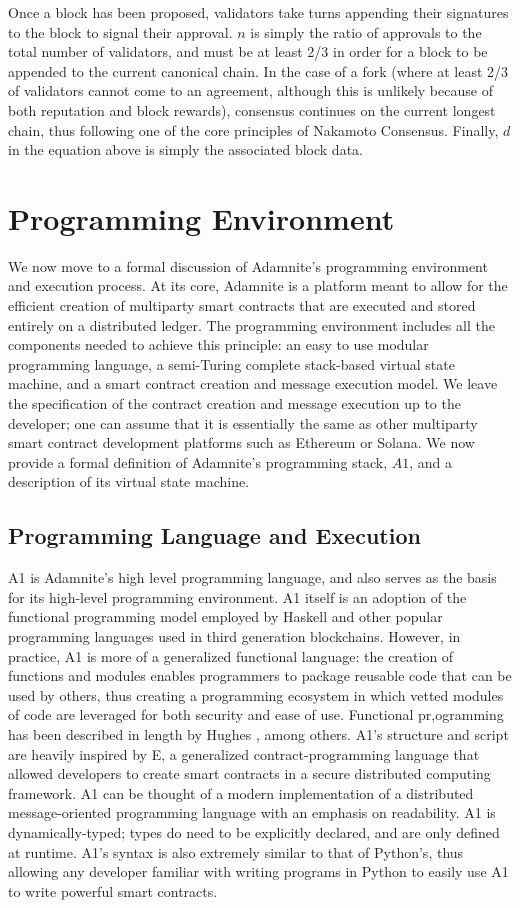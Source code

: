 \documentclass[conference]{IEEEtran}
\begin{document}
Once a block has been proposed, validators take turns appending their signatures to the block to signal their approval. $n$ is simply the ratio of approvals to the total number of validators, and must be at least 2/3 in order for a block to be appended to the current canonical chain. In the case of a fork (where at least 2/3 of validators cannot come to an agreement, although this is unlikely because of both reputation and block rewards), consensus continues on the current longest chain, thus following one of the core principles of Nakamoto Consensus.  Finally, $d$ in the equation above is simply the associated block data.

\section{Programming Environment}

We now move to a formal discussion of Adamnite's programming environment and execution process. At its core, Adamnite is a platform meant to allow for the efficient creation of multiparty smart contracts that are executed and stored entirely on a distributed ledger. The programming environment includes all the components needed to achieve this principle: an easy to use modular programming language, a semi-Turing complete stack-based virtual state machine, and a smart contract creation and message execution model. We leave the specification of the contract creation and message execution up to the developer; one can assume that it is essentially the same as other multiparty smart contract development platforms such as Ethereum or Solana. We now provide a formal definition of Adamnite's programming stack, $A1$, and a description of its virtual state machine. 

\subsection{Programming Language and Execution}
A1 is Adamnite's high level programming language, and also serves as the basis for its high-level programming environment. A1 itself is an adoption of the functional programming model employed by Haskell and other popular programming languages used in third generation blockchains. However, in practice, A1 is more of a generalized functional language: the creation of functions and modules enables programmers to package reusable code that can be used by others, thus creating a programming ecosystem in which vetted modules of code are leveraged for both security and ease of use. Functional pr,ogramming has been described in length by Hughes \cite{hughesFunctional}, among others. A1's structure and script are heavily inspired by E, a generalized contract-programming language that allowed developers to create smart contracts in a secure distributed computing framework. A1 can be thought of a modern implementation of a distributed message-oriented programming language with an emphasis on readability. A1 is dynamically-typed; types do need to be explicitly declared, and are only defined at runtime. A1's syntax is also extremely similar to that of Python's, thus allowing any developer familiar with writing programs in Python to easily use A1 to write powerful smart contracts.  \\
\end{document}
